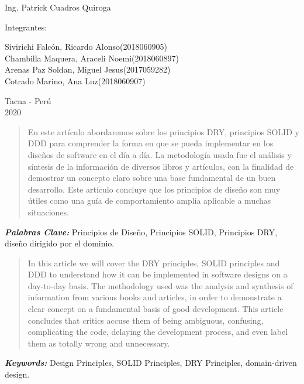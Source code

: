 \documentclass{article}
\providecommand{\keywords}[1]{
  \small	
  \textbf{\textit{\quad \quad Keywords: }} #1}
\providecommand{\pclave}[1]{
  \small	
  \textbf{\textit{\quad \quad Palabras Clave: }} #1}
\begin{document}
\begin{titlepage}
\begin{center}
\vspace*{0.1in}
\begin{large}
 Ing. Patrick Cuadros Quiroga\\
\end{large}

\vspace*{0.2in}
\vspace*{0.1in}
\begin{large}

Integrantes: \\
\begin{flushleft}
Sivirichi Falcón, Ricardo Alonso\hfill(2018060905) \\
Chambilla Maquera, Araceli Noemi\hfill(2018060897)\\
Arenas Paz Soldan, Miguel Jesus\hfill(2017059282)\\
Cotrado Marino, Ana Luz\hfill(2018060907)\\

\end{flushleft}
\end{large}

\vspace*{0.1in}
\begin{large}
Tacna - Perú\\
2020
\end{large}
\end{center}
\end{titlepage}

\begin{abstract}
\quad En este artículo abordaremos sobre los principios DRY, principios SOLID y  DDD para comprender la forma en que se pueda implementar en los diseños de software en el día a día. La metodología usada fue el análisis y síntesis de la información de diversos libros y artículos, con la finalidad de demostrar un concepto claro sobre una base fundamental de un buen desarrollo. Este artículo concluye que los principios de diseño son muy útiles como una guía de comportamiento amplia aplicable a muchas situaciones.

\end{abstract}
\pclave{Principios de Diseño, Principios SOLID, Principios DRY, diseño dirigido por el dominio.}

\begin{abstract}
\quad In this article we will cover the DRY principles, SOLID principles and DDD to understand how it can be implemented in software designs on a day-to-day basis. The methodology used was the analysis and synthesis of information from various books and articles, in order to demonstrate a clear concept on a fundamental basis of good development. This article concludes that critics accuse them of being ambiguous, confusing, complicating the code, delaying the development process, and even label them as totally wrong and unnecessary. 

\end{abstract}
\keywords{Design Principles, SOLID Principles, DRY Principles, domain-driven design.}
\end{document}
